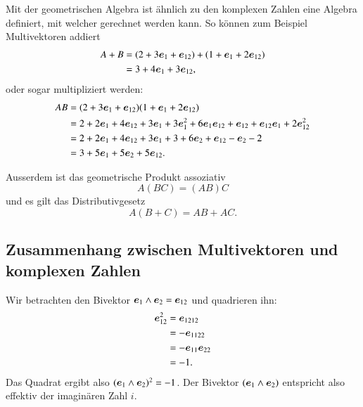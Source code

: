 Mit der geometrischen Algebra ist ähnlich zu den komplexen Zahlen eine Algebra definiert,
mit welcher gerechnet werden kann. So können zum Beispiel Multivektoren addiert
\begin{align*}
A + B &= (2 + 3 \eone + \eot) + (1 + \eone + 2 \eot) \\
&= 3 + 4 \eone + 3 \eot,
\end{align*}
oder sogar multipliziert werden:
\begin{align*}
A  B
&=
(2 + 3 \eone + \eot) (1 + \eone + 2 \eot)
\notag
\\
&=
2 + 2 \eone + 4 \eot + 3 \eone + 3 \eone^2 + 6 \eone \eot + \eot + \eot \eone + 2 \eot^2
\notag
\\
&=
2 + 2 \eone + 4 \eot + 3 \eone + 3 + 6 \etwo + \eot - \etwo - 2
\notag
\\
&=
3 + 5 \eone + 5 \etwo + 5 \eot.
\end{align*}

Ausserdem ist das geometrische Produkt assoziativ
%
\begin{equation*}
A (B C) = (A B) C
\end{equation*}
und es gilt das Distributivgesetz
%
\begin{equation*}
  A (B + C) = AB + AC.
\end{equation*}


\newcommand\equalhat{\mathrel{\stackon[1.5pt]{=}{\stretchto{%
    \scalerel*[\widthof{=}]{\wedge}{\rule{1ex}{3ex}}}{0.5ex}}}}

\subsection{Zusammenhang zwischen Multivektoren und komplexen Zahlen}
Wir betrachten den Bivektor $\eone \wedge \etwo = \eot$ und quadrieren ihn:
\begin{align*}
    \eot^2 &= \boldsymbol{e}_{1212} \\
    &= -\boldsymbol{e}_{1122} \\
    &= -\boldsymbol{e}_{11} \boldsymbol{e}_{22} \\
    &= -1.
\end{align*}
Das Quadrat ergibt also $(\eone \wedge \etwo)^2 = -1$. Der Bivektor
$(\eone \wedge \etwo)$ entspricht also effektiv der imaginären Zahl $i$.

